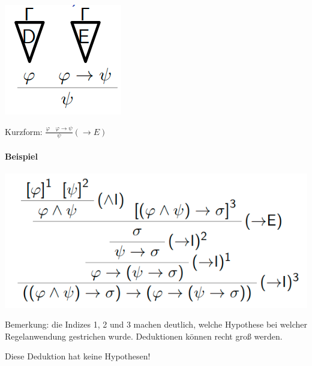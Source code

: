 \documentclass[a4paper]{article}
\begin{document}
\begin{multicols}{3}
  \includegraphics[width=\linewidth]{Assets/Logik-Implikationselimination.png}

  Kurzform:
  $\frac{\varphi\quad \varphi\rightarrow\psi}{\psi} (\rightarrow E)$

  \paragraph{Beispiel}\label{beispiel-1}


  \includegraphics[width=\linewidth]{Assets/Logik-Implikationseleimination-beispiel.png}

  Bemerkung: die Indizes 1, 2 und 3 machen deutlich, welche Hypothese bei
  welcher Regelanwendung gestrichen wurde. Deduktionen können recht groß
  werden.

  Diese Deduktion hat keine Hypothesen!


\end{multicols}
\end{document}
